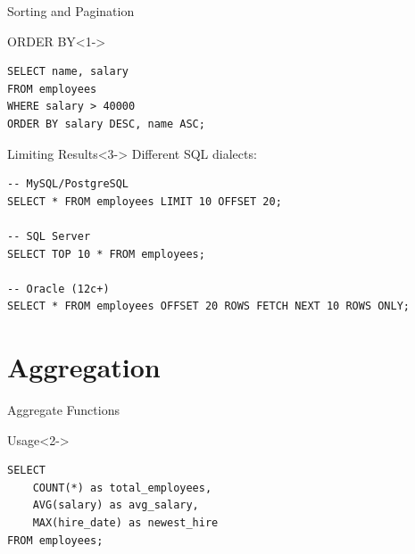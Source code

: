\documentclass[aspectratio=169,11pt]{beamer}
\begin{document}
\begin{frame}[fragile]{Sorting and Pagination}
\begin{exampleblock}{ORDER BY}<1->
\begin{lstlisting}
SELECT name, salary
FROM employees
WHERE salary > 40000
ORDER BY salary DESC, name ASC;
\end{lstlisting}
\end{exampleblock}

\pause
\pause
\begin{block}{Limiting Results}<3->
Different SQL dialects:
\begin{lstlisting}
-- MySQL/PostgreSQL
SELECT * FROM employees LIMIT 10 OFFSET 20;

-- SQL Server
SELECT TOP 10 * FROM employees;

-- Oracle (12c+)
SELECT * FROM employees OFFSET 20 ROWS FETCH NEXT 10 ROWS ONLY;
\end{lstlisting}
\end{block}
\end{frame}

\section{Aggregation}
\begin{frame}[fragile]{Aggregate Functions}

\pause
\begin{exampleblock}{Usage}<2->
\begin{lstlisting}
SELECT
    COUNT(*) as total_employees,
    AVG(salary) as avg_salary,
    MAX(hire_date) as newest_hire
FROM employees;
\end{lstlisting}
\end{exampleblock}
\end{frame}
\end{document}
